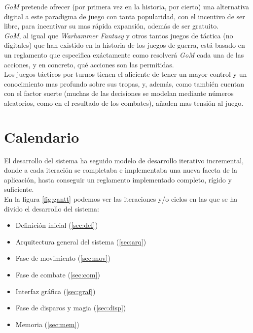 \documentclass[a4paper,11pt]{article} %
\begin{document}
\noindent \emph{GoM} pretende ofrecer (por primera vez en la
historia, por cierto) una alternativa digital a este paradigma de
juego con tanta popularidad, con el incentivo de ser libre, para
incentivar su mas rápida expansión, además de ser gratuito.\\

\noindent \emph{GoM}, al igual que \emph{Warhammer Fantasy} y otros
tantos juegos de táctica (no digitales) que han existido en la
historia de los juegos de guerra, está basado en un reglamento que
especifica exáctamente como resolverá \emph{GoM} cada una de las
acciones, y en concreto, qué acciones son las permitidas.\\

\noindent Los juegos tácticos por turnos tienen el aliciente de tener
un mayor control y un conocimiento mas profundo sobre sus tropas, y,
además, como también cuentan con el factor suerte (muchas de las
decisiones se modelan mediante números aleatorios, como en el
resultado de los combates), añaden mas tensión al juego.

\section{Calendario}
\noindent
El desarrollo del sistema ha seguido modelo de desarrollo iterativo
incremental, donde a cada iteración se completaba e implementaba una
nueva faceta de la aplicación, hasta conseguir un reglamento
implementado completo, rígido y suficiente.\\

\noindent
En la figura \ref{fig:gantt} podemos ver las iteraciones y/o ciclos en
las que se ha divido el desarrollo del sistema:

\begin{itemize}
\item Definición inicial (\ref{sec:def})
\item Arquitectura general del sistema (\ref{sec:arq})
\item Fase de movimiento (\ref{sec:mov})
\item Fase de combate (\ref{sec:com})
\item Interfaz gráfica (\ref{sec:graf})
\item Fase de disparos y magia (\ref{sec:disp})
\item Memoria (\ref{sec:mem})
\end{itemize}
\end{document}
